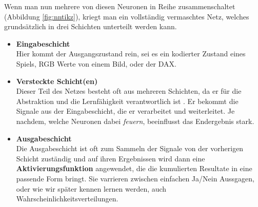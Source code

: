             \noindent
            Wenn man nun mehrere von diesen Neuronen in Reihe zusammenschaltet (Abbildung \ref{fig:nntikz}), kriegt man ein vollständig vermaschtes Netz, welches grundsätzlich in drei Schichten unterteilt werden kann.
            \begin{itemize}
                \setlength{\itemsep}{5pt}
                \item \textbf{Eingabeschicht} \\
                    Hier kommt der Ausgangszustand rein, sei es ein kodierter Zustand eines Spiels, RGB Werte von einem Bild, oder der DAX.
                \item \textbf{Versteckte Schicht(en)} \\
                    Dieser Teil des Netzes besteht oft aus mehreren Schichten, da er für die Abstraktion und die Lernfähigkeit verantwortlich ist \cite{ANNModeling}. Er bekommt die Signale aus der Eingabeschicht, die er verarbeitet und weiterleitet. Je nachdem, welche Neuronen dabei \textit{feuern}, beeinflusst das Endergebnis stark.
                \item \textbf{Ausgabeschicht} \\
                    Die Ausgabeschicht ist oft zum Sammeln der Signale von der vorherigen Schicht zuständig und auf ihren Ergebnissen wird dann eine \textbf{Aktivierungsfunktion} angewendet, die die kumulierten Resultate in eine passende Form bringt. Sie varrieren zwischen einfachen Ja/Nein Aussgagen, oder wie wir später kennen lernen werden, auch Wahrscheinlichkeitsverteilungen.

            \end{itemize}


